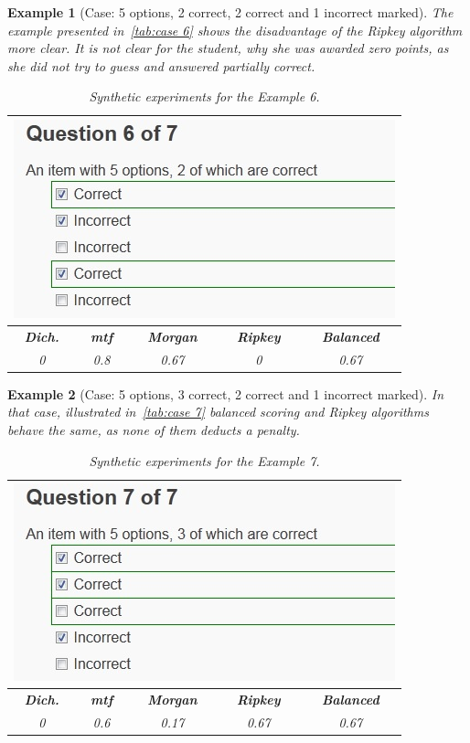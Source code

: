 \documentclass[PhD, Submit, ngerman,UKenglish,table]{scrbook}
\newtheorem{example}{Example}
\begin{document}
\begin{example}[Case: 5 options, 2 correct, 2 correct and 1 incorrect marked]
The example presented in~\autoref{tab:case 6} shows the disadvantage of the Ripkey algorithm more clear.
It is not clear for the student, why she was awarded zero points, as she did not try to guess and answered partially correct.

\begin{table}[h!]
	\centering
	\begin{tabularx}{0.55\columnwidth}{c c c c c} 
	\toprule  
    \multicolumn{5}{c}{\includegraphics[width=0.4\columnwidth]{images/case6.jpg}}\\
    \midrule
    \textbf{Dich.}&\textbf{\gls{mtf}}&\textbf{Morgan}&\textbf{Ripkey}&\textbf{Balanced}\\
	\midrule
    0&0.8&0.67&0&0.67\\
	\bottomrule
    \end{tabularx}
	\caption{Synthetic experiments for the Example 6.}
	\label{tab:case 6}
\end{table}

\end{example}



\begin{example}[Case: 5 options, 3 correct, 2 correct and 1 incorrect marked]
In that case, illustrated in~\autoref{tab:case 7} balanced scoring and Ripkey algorithms behave the same, as none of them deducts a penalty.

\begin{table}[h!]
	\centering
	\begin{tabularx}{0.55\columnwidth}{c c c c c}    
    \toprule
    \multicolumn{5}{c}{\includegraphics[width=0.4\columnwidth]{images/case7.jpg}}\\
    \midrule
    \textbf{Dich.}&\textbf{\gls{mtf}}&\textbf{Morgan}&\textbf{Ripkey}&\textbf{Balanced}\\
	\midrule
    0&0.6&0.17&0.67&0.67\\
	\bottomrule
    \end{tabularx}
	\caption{Synthetic experiments for the Example 7.}
	\label{tab:case 7}
\end{table}
\end{example}
\end{document}
